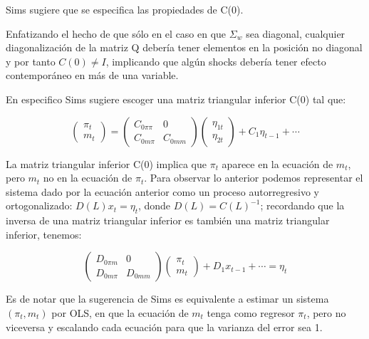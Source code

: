 \documentclass[
]{book}
\begin{document}
Sims sugiere que se especifica las propiedades de C(0).

Enfatizando el hecho de que sólo en el caso en que \(\Sigma_{w}\) sea diagonal, cualquier diagonalización de la matriz Q debería tener elementos en la posición no diagonal y por tanto \(C(0)\neq I\), implicando que algún shocks debería tener efecto contemporáneo en más de una variable.

En especifico Sims sugiere escoger una matriz triangular inferior C(0) tal que:

\begin{equation}
    \left( \begin{array}{c}
    \pi_{t} \\
      m_{t} 
    \end{array}\right)=\left( \begin{array}{cc}
    C_{0\pi \pi} & 0\\
    C_{0m  \pi} & C_{0mm}
    \end{array}
    \right) \left( \begin{array}{c}
    \eta_{1t}\\
    \eta_{2t}
    \end{array}
    \right) +C_{1}\eta_{t-1}+\cdots
\end{equation}

La matriz triangular inferior C(0) implica que \(\pi_{t}\) aparece en la ecuación de \(m_{t}\), pero \(m_{t}\) no en la ecuación de \(\pi_{t}\). Para observar lo anterior podemos representar el sistema dado por la ecuación anterior como un proceso autorregresivo y ortogonalizado: \(D(L)x_{t}=\eta_{t}\), donde \(D(L)=C(L)^{-1}\); recordando que la inversa de una matriz triangular inferior es también una matriz triangular inferior, tenemos:

\begin{equation}
      \left( \begin{array}{cc}
      D_{0\pi m} & 0\\
      D_{0m \pi} & D_{0mm}
      \end{array}
      \right)
      \left( \begin{array}{c}
      \pi_{t} \\
       m_{t} 
      \end{array}\right)+D_{1}x_{t-1}+\cdots=\eta_{t}\nonumber
\end{equation}

Es de notar que la sugerencia de Sims es equivalente a estimar un sistema \((\pi_{t}, m_{t})\) por OLS, en que la ecuación de \(m_{t}\) tenga como regresor \(\pi_{t}\), pero no viceversa y escalando cada ecuación para que la varianza del error sea 1.
\end{document}

